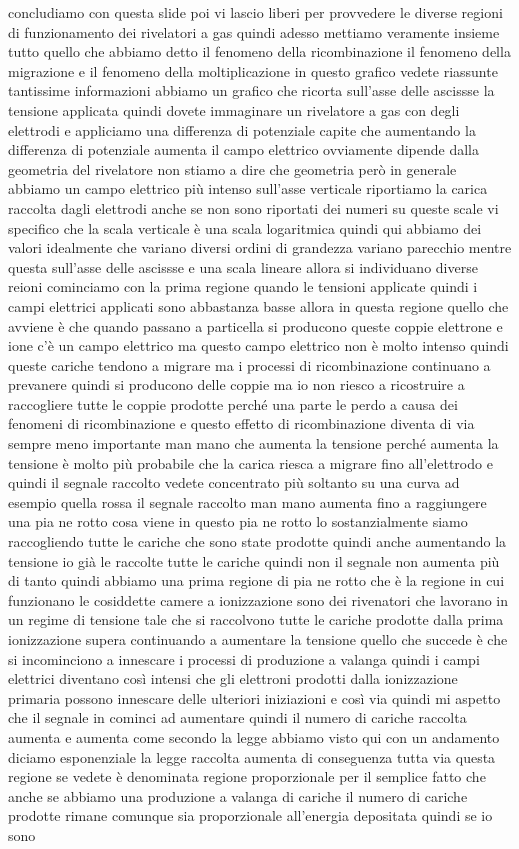 {concludiamo con questa slide poi vi lascio liberi per provvedere le diverse regioni di funzionamento dei rivelatori a gas quindi adesso mettiamo veramente insieme tutto quello che abbiamo detto il fenomeno della ricombinazione il fenomeno della migrazione e il fenomeno della moltiplicazione in questo grafico vedete riassunte tantissime informazioni abbiamo un grafico che ricorta sull'asse delle ascissse la tensione applicata quindi dovete immaginare un rivelatore a gas con degli elettrodi e appliciamo una differenza di potenziale capite che aumentando la differenza di potenziale aumenta il campo elettrico ovviamente dipende dalla geometria del rivelatore non stiamo a dire che geometria però in generale abbiamo un campo elettrico più intenso sull'asse verticale riportiamo la carica raccolta dagli elettrodi anche se non sono riportati dei numeri su queste scale vi specifico che la scala verticale è una scala logaritmica quindi qui abbiamo dei valori idealmente che variano diversi ordini di grandezza variano parecchio mentre questa sull'asse delle ascissse e una scala lineare allora si individuano diverse reioni cominciamo con la prima regione quando le tensioni applicate quindi i campi elettrici applicati sono abbastanza basse allora in questa regione quello che avviene è che quando passano a particella si producono queste coppie elettrone e ione c'è un campo elettrico ma questo campo elettrico non è molto intenso quindi queste cariche tendono a migrare ma i processi di ricombinazione continuano a prevanere quindi si producono delle coppie ma io non riesco a ricostruire a raccogliere tutte le coppie prodotte perché una parte le perdo a causa dei fenomeni di ricombinazione e questo effetto di ricombinazione diventa di via sempre meno importante man mano che aumenta la tensione perché aumenta la tensione è molto più probabile che la carica riesca a migrare fino all'elettrodo e quindi il segnale raccolto vedete concentrato più soltanto su una curva ad esempio quella rossa il segnale raccolto man mano aumenta fino a raggiungere una pia ne rotto cosa viene in questo pia ne rotto lo sostanzialmente siamo raccogliendo tutte le cariche che sono state prodotte quindi anche aumentando la tensione io già le raccolte tutte le cariche quindi non il segnale non aumenta più di tanto quindi abbiamo una prima regione di pia ne rotto che è la regione in cui funzionano le cosiddette camere a ionizzazione sono dei rivenatori che lavorano in un regime di tensione tale che si raccolvono tutte le cariche prodotte dalla prima ionizzazione supera continuando a aumentare la tensione quello che succede è che si incominciono a innescare i processi di produzione a valanga quindi i campi elettrici diventano così intensi che gli elettroni prodotti dalla ionizzazione primaria possono innescare delle ulteriori iniziazioni e così via quindi mi aspetto che il segnale in cominci ad aumentare quindi il numero di cariche raccolta aumenta e aumenta come secondo la legge abbiamo visto qui con un andamento diciamo esponenziale la legge raccolta aumenta di conseguenza tutta via questa regione se vedete è denominata regione proporzionale per il semplice fatto che anche se abbiamo una produzione a valanga di cariche il numero di cariche prodotte rimane comunque sia proporzionale all'energia depositata quindi se io sono }
